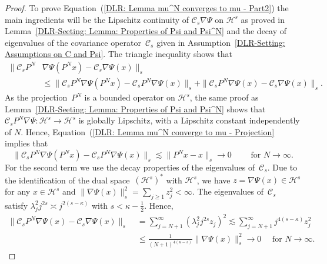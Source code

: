 \begin{proof}
  To prove Equation~(\ref{DLR: Lemma mu^N converges to mu - Part2}) the main ingredients will be the Lipschitz continuity of $\mathcal{C}_s \nabla \Psi$ on $\mathcal{H}^s$ as proved in Lemma~\ref{DLR-Seeting: Lemma: Properties of Psi and Psi^N} and the decay of eigenvalues of the covariance operator~$\mathcal{C}_s$ given in Assumption~\ref{DLR-Setting: Assumptions on C and Psi}. The triangle inequality shows that
  \begin{equation*}
    \begin{split}
     \|  \mathcal{C}_s P^N & \nabla  \Psi(P^Nx)  - \mathcal{C}_s \nabla \Psi(x) \|_s \\
     & \leq \|  \mathcal{C}_s P^N  \nabla  \Psi(P^Nx)  - \mathcal{C}_s P^N \nabla \Psi(x) \|_s + \|  \mathcal{C}_s P^N  \nabla  \Psi(x)  - \mathcal{C}_s \nabla \Psi(x) \|_s.
    \end{split}
  \end{equation*}
  As the projection~$P^N$ is a bounded operator on $\mathcal{H}^s$, the same proof as Lemma~\ref{DLR-Seeting: Lemma: Properties of Psi and Psi^N} shows that $\mathcal{C}_sP^N\nabla \Psi : \mathcal{H}^s \to \mathcal{H}^s$ is globally Lipschitz, with a Lipschitz constant independently of $N$. Hence, Equation~(\ref{DLR: Lemma mu^N converge to mu - Projection} implies that
  \begin{equation*}
    \|  \mathcal{C}_s P^N  \nabla  \Psi(P^Nx)  - \mathcal{C}_s P^N \nabla \Psi(x) \|_s \lesssim  \| P^N x - x \|_s \to 0 \qquad \text{ for } N \to \infty.
  \end{equation*}
  For the second term we use the decay properties of the eigenvalues of~$\mathcal{C}_s$. Due to the identification of the dual space~$(\mathcal{H}^s)^*$ with $\mathcal{H}^s$, we have $z = \nabla \Psi (x) \in \mathcal{H}^s$ for any $x \in \mathcal{H}^s$ and $\| \nabla \Psi (x) \|_s^2 = \sum_{j \geq 1} z_j^2 < \infty$. The eigenvalues of~$\mathcal{C}_s$ satisfy $\lambda_j^2 j^{2s} \asymp j^{2(s-\kappa)}$ with $s < \kappa - \tfrac{1}{2}$. Hence,
    \begin{equation*}
    \begin{split}
     \|  \mathcal{C}_s P^N  \nabla  \Psi(x)  - \mathcal{C}_s \nabla \Psi(x) \|_s  & \; = \sum_{j = N+1}^{\infty} (\lambda_j^2 j^{2s} z_j)^2 \lesssim \sum_{j = N+1}^{\infty} j^{4(s-\kappa)} z_j^2 \\
     & \; \leq \frac{1}{(N+1)^{4(\kappa - s)}} \| \nabla \Psi (x) \|_s^2 \to 0 \quad \text{ for } N \to \infty.
    \end{split}
  \end{equation*}

\end{proof}




